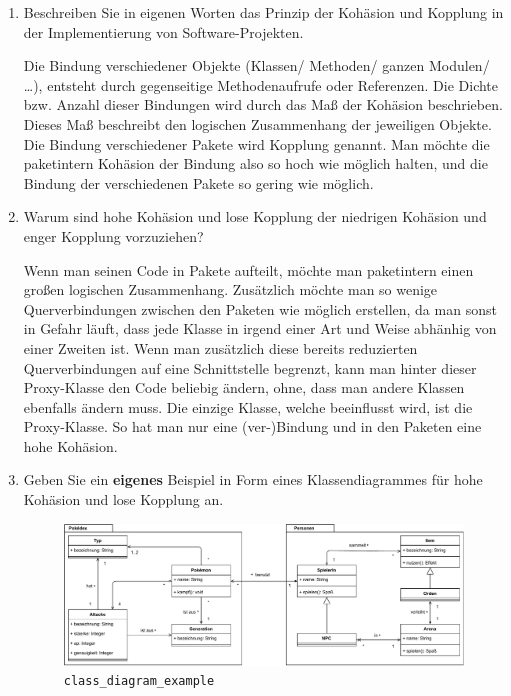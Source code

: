 \documentclass{article}
\newcommand{\gqq}[1]{\glqq{}#1\grqq{}}
\begin{document}
    \begin{enumerate}
        \item Beschreiben Sie in eigenen Worten das Prinzip der Kohäsion und Kopplung in der Implementierung von Software-Projekten.

            Die Bindung verschiedener Objekte (Klassen/ Methoden/ ganzen Modulen/ \ldots), entsteht durch gegenseitige Methodenaufrufe oder Referenzen.
            Die Dichte bzw. Anzahl dieser Bindungen wird durch das Maß der Kohäsion beschrieben.
            Dieses Maß beschreibt den logischen Zusammenhang der jeweiligen Objekte.
            Die Bindung verschiedener Pakete wird Kopplung genannt.
            Man möchte die paketintern Kohäsion der Bindung also so hoch wie möglich halten, und die Bindung der verschiedenen Pakete so gering wie möglich.
        
        \item Warum sind hohe Kohäsion und lose Kopplung der niedrigen Kohäsion und enger Kopplung vorzuziehen?
        
            Wenn man seinen Code in Pakete aufteilt, möchte man paketintern einen großen logischen Zusammenhang.
            Zusätzlich möchte man so wenige Querverbindungen zwischen den Paketen wie möglich erstellen, da man sonst in Gefahr läuft, dass jede Klasse in irgend einer Art und Weise abhänhig von einer Zweiten ist.
            Wenn man zusätzlich diese bereits reduzierten Querverbindungen auf eine Schnittstelle begrenzt, kann man \gqq{hinter} dieser \gqq{Proxy}-Klasse den Code beliebig ändern, ohne, dass man andere Klassen ebenfalls ändern muss.
            Die einzige Klasse, welche beeinflusst wird, ist die \gqq{Proxy}-Klasse. So hat man nur eine (ver-)Bindung und in den Paketen eine hohe Kohäsion.

        \item Geben Sie ein \textbf{eigenes} Beispiel in Form eines Klassendiagrammes für hohe Kohäsion und lose Kopplung an.
        
            \begin{figure}[ht]
                \includegraphics[width=\textwidth]{swt_wende_tim_h07_class_diagram_example.pdf}
                \caption{\texttt{class\_diagram\_example}}
            \end{figure}
    \end{enumerate}
\end{document}
